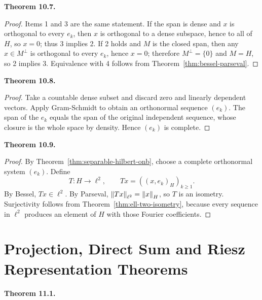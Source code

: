 \documentclass[11pt]{article}
\newenvironment{theoremstmt}[1]{%
  \par\medskip\noindent\textbf{Theorem #1. }\itshape
}{\par\medskip}
\begin{document}
\begin{theoremstmt}{10.7}
\thmOrthonormalCompleteEquiv
\end{theoremstmt}

\begin{proof}
Items 1 and 3 are the same statement. If the span is dense and $x$ is orthogonal to every $e_k$, then $x$ is orthogonal to a dense subspace, hence to all of $H$, so $x=0$; thus 3 implies 2. If 2 holds and $M$ is the closed span, then any $x\in M^\perp$ is orthogonal to every $e_k$, hence $x=0$; therefore $M^\perp=\{0\}$ and $M=H$, so 2 implies 3. Equivalence with 4 follows from Theorem~\ref{thm:bessel-parseval}.
\end{proof}

\begin{theoremstmt}{10.8}
\thmSeparableHilbertONB
\end{theoremstmt}

\begin{proof}
Take a countable dense subset and discard zero and linearly dependent vectors. Apply Gram-Schmidt to obtain an orthonormal sequence $(e_k)$. The span of the $e_k$ equals the span of the original independent sequence, whose closure is the whole space by density. Hence $(e_k)$ is complete.
\end{proof}

\begin{theoremstmt}{10.9}
\thmSeparableHilbertIsomorphicEllTwo
\end{theoremstmt}

\begin{proof}
By Theorem~\ref{thm:separable-hilbert-onb}, choose a complete orthonormal system $(e_k)$. Define
\[
T:H\to \ell^2,
\qquad
Tx=((x,e_k)_H)_{k\ge 1}.
\]
By Bessel, $Tx\in\ell^2$. By Parseval, $\left\lVert Tx\right\rVert_{\ell^2}=\left\lVert x\right\rVert_H$, so $T$ is an isometry. Surjectivity follows from Theorem~\ref{thm:ell-two-isometry}, because every sequence in $\ell^2$ produces an element of $H$ with those Fourier coefficients.
\end{proof}

\section{Projection, Direct Sum and Riesz Representation Theorems}

\begin{theoremstmt}{11.1}
\thmProjection
\end{theoremstmt}
\end{document}

